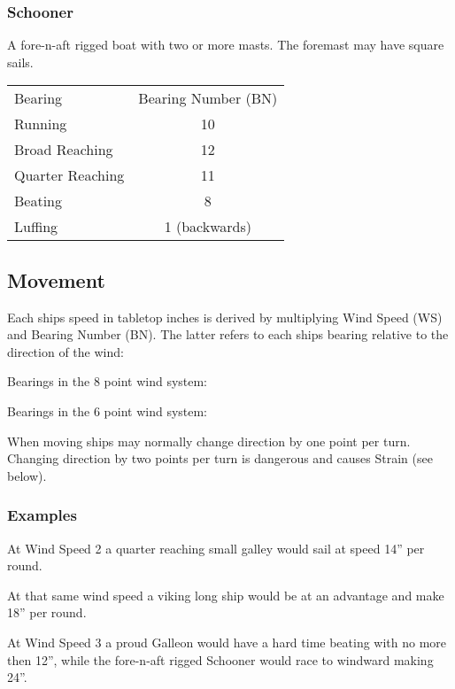 \documentclass[11pt]{wbzine}
\begin{document}
\begin{multicols}{2}
\subsubsection{Schooner}

A fore-n-aft rigged boat with two or more masts. The foremast may have
square sails.


\begin{tabularx}{\columnwidth}{Zc}
Bearing & Bearing Number (BN) \\
Running & 10 \\
Broad Reaching & 12 \\
Quarter Reaching & 11 \\
Beating & 8 \\
Luffing & 1 (backwards) \\
\end{tabularx}

\subsection{Movement}

Each ships speed in tabletop inches is derived by multiplying Wind Speed
(WS) and Bearing Number (BN). The latter refers to each ships bearing
relative to the direction of the wind:

Bearings in the 8 point wind system:


Bearings in the 6 point wind system:



When moving ships may normally change direction by one point per turn.
Changing direction by two points per turn is dangerous and causes Strain
(see below).


\subsubsection{Examples}

At Wind Speed 2 a quarter reaching small galley would sail at speed 14''
per round.

At that same wind speed a viking long ship would be at an advantage and
make 18'' per round.

At Wind Speed 3 a proud Galleon would have a hard time beating with no
more then 12'', while the fore-n-aft rigged Schooner would race to
windward making 24''.


\end{multicols}
\end{document}
